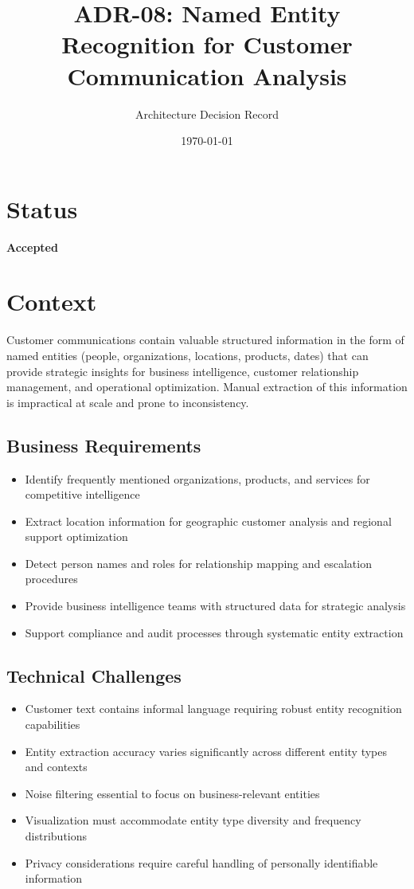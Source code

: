 \documentclass[11pt]{article}
\title{\textbf{ADR-08: Named Entity Recognition for Customer Communication Analysis}}
\author{Architecture Decision Record}
\date{\today}
\begin{document}
\maketitle

\section{Status}
\textbf{Accepted}

\section{Context}

Customer communications contain valuable structured information in the form of named entities (people, organizations, locations, products, dates) that can provide strategic insights for business intelligence, customer relationship management, and operational optimization. Manual extraction of this information is impractical at scale and prone to inconsistency.

\subsection{Business Requirements}
\begin{itemize}
\item Identify frequently mentioned organizations, products, and services for competitive intelligence
\item Extract location information for geographic customer analysis and regional support optimization
\item Detect person names and roles for relationship mapping and escalation procedures
\item Provide business intelligence teams with structured data for strategic analysis
\item Support compliance and audit processes through systematic entity extraction
\end{itemize}

\subsection{Technical Challenges}
\begin{itemize}
\item Customer text contains informal language requiring robust entity recognition capabilities
\item Entity extraction accuracy varies significantly across different entity types and contexts
\item Noise filtering essential to focus on business-relevant entities
\item Visualization must accommodate entity type diversity and frequency distributions
\item Privacy considerations require careful handling of personally identifiable information
\end{itemize}
\end{document}
